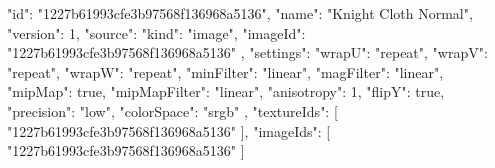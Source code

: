 {
  "id": "1227b61993cfe3b97568f136968a5136",
  "name": "Knight Cloth Normal",
  "version": 1,
  "source": {
    "kind": "image",
    "imageId": "1227b61993cfe3b97568f136968a5136"
  },
  "settings": {
    "wrapU": "repeat",
    "wrapV": "repeat",
    "wrapW": "repeat",
    "minFilter": "linear",
    "magFilter": "linear",
    "mipMap": true,
    "mipMapFilter": "linear",
    "anisotropy": 1,
    "flipY": true,
    "precision": "low",
    "colorSpace": "srgb"
  },
  "textureIds": [
    "1227b61993cfe3b97568f136968a5136"
  ],
  "imageIds": [
    "1227b61993cfe3b97568f136968a5136"
  ]
}
